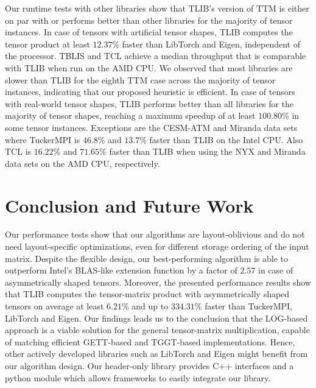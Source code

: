 Our runtime tests with other libraries show that TLIB's  version of TTM is either on par with or performs better than other libraries for the majority of tensor instances.
In case of tensors with artificial tensor shapes, TLIB computes the tensor product at least $12.37$\% faster than LibTorch and Eigen, independent of the processor.
TBLIS and TCL achieve a median throughput that is comparable with TLIB when run on the AMD CPU.
We observed that most libraries are slower than TLIB for the eighth TTM case across the majority of tensor instances, indicating that our proposed heuristic is efficient.
In case of tensors with real-world tensor shapes, TLIB performs better than all libraries for the majority of tensor shapes, reaching a maximum speedup of at least $100.80$\% in some tensor instances.
Exceptions are the CESM-ATM and Miranda data sets where TuckerMPI is $46.8$\% and $13.7$\% faster than TLIB on the Intel CPU.
Also TCL is $16.22$\% and $71.65$\% faster than TLIB when using the NYX and Miranda data sets on the AMD CPU, respectively.


\section{Conclusion and Future Work}
\label{sec:conclusion}
Our performance tests show that our algorithms are layout-oblivious and do not need layout-specific optimizations, even for different storage ordering of the input matrix.
Despite the flexible design, our best-performing algorithm is able to outperform Intel's BLAS-like extension function  by a factor of $2.57$ in case of asymmetrically shaped tensors.
Moreover, the presented performance results show that TLIB computes the tensor-matrix product with asymmetrically shaped tensors on average at least $6.21$\% and up to $334.31$\% faster than TuckerMPI, LibTorch and Eigen.
Our findings leads us to the conclusion that the LOG-based approach is a viable solution for the general tensor-matrix multiplication, capable of matching efficient GETT-based and TGGT-based implementations.
Hence, other actively developed libraries such as LibTorch and Eigen might benefit from our algorithm design.
Our header-only library provides C++ interfaces and a python module which allows frameworks to easily integrate our library.


